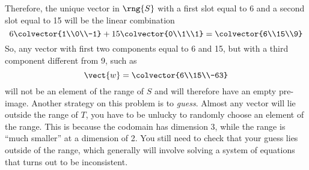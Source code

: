 %
Therefore, the unique vector in $\rng{S}$ with a first slot equal to 6 and a second slot equal to 15 will be the linear combination
%
\begin{equation*}
6\colvector{1\\0\\-1}+15\colvector{0\\1\\1}=\colvector{6\\15\\9}
\end{equation*}
%
So, any vector with first two components equal to 6 and 15, but with a third component different from 9, such as
%
\begin{equation*}
\vect{w}=\colvector{6\\15\\-63}
\end{equation*}
%
will not be an element of the range of $S$ and will therefore have an empty pre-image.
%
Another strategy on this problem is to {\em guess}.  Almost any vector will lie outside the range of $T$, you have to be unlucky to randomly choose an element of the range.  This is because the codomain has dimension 3, while the range is ``much smaller'' at a dimension of 2.  You still need to check that your guess lies outside of the range, which generally will involve solving a system of equations that turns out to be inconsistent.